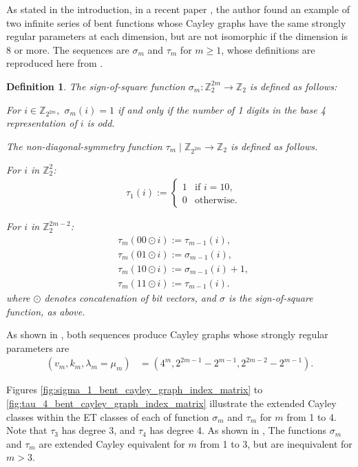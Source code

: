 \documentclass[12pt,a4paper]{article}
\newcommand{\mb}[1]{\mathbb{#1}}
\newcommand{\Z}{\mb{Z}}
\newcommand{\To}{\rightarrow}
\newtheorem*{definition}{Definition}
\begin{document}
As stated in the introduction, in a recent paper \cite{Leo17Hurwitz},
the author found an example of two infinite series of bent functions whose
Cayley graphs have the same strongly regular parameters at each dimension,
but are not isomorphic if the dimension is 8 or more.
The sequences are $\sigma_m$ and $\tau_m$ for $m \geqslant 1$,
whose definitions are reproduced here from \cite{Leo15Twin}.

\begin{definition}
\label{def-sigma-tau}
The sign-of-square function $\sigma_m : \Z_2^{2 m} \To \Z_2$ is defined as follows:

For $i \in \Z_{2^{2m}},$ $\sigma_m(i) = 1$ if and only if the number of
1 digits in the base 4 representation of $i$ is odd.

The non-diagonal-symmetry function $\tau_m \mid \Z_{2^{2 m}} \To \Z_2$
is defined as follows.

For $i$ in $\Z_2^2$:
\begin{align*}
&\tau_1(i) :=
\begin{cases}
1 &\text{if~}i = 10,
\\
0 &\text{otherwise}.
\end{cases}
\end{align*}

For $i$ in $\Z_2^{2 m - 2}$:
\begin{align*}
&\tau_m (00 \odot i) := \tau_{m-1}(i),
\\
&\tau_m (01 \odot i) := \sigma_{m-1}(i),
\\
&\tau_m (10 \odot i) := \sigma_{m-1}(i) + 1,
\\
&\tau_m (11 \odot i) := \tau_{m-1}(i).
\end{align*}
where $\odot$ denotes concatenation of bit vectors, and $\sigma$ is the sign-of-square function, as above.
\end{definition}

As shown in  \cite{Leo15Twin}, both sequences produce Cayley graphs whose strongly regular parameters are
\begin{align*}
(v_m,k_m,\lambda_m=\mu_m) &= (4^m, 2^{2 m - 1} - 2^{m-1}, 2^{2 m - 2} - 2^{m-1}).
\end{align*}

Figures \ref{fig:sigma_1_bent_cayley_graph_index_matrix} to \ref{fig:tau_4_bent_cayley_graph_index_matrix}
illustrate the extended Cayley classes within the ET classes of each of function $\sigma_m$ and $\tau_m$ for $m$ from 1 to 4.
Note that $\tau_3$ has degree 3, and $\tau_4$ has degree 4.
As shown in \cite{Leo17Hurwitz},
The functions $\sigma_m$ and $\tau_m$ are extended Cayley equivalent for $m$ from 1 to 3, but are inequivalent for $m>3$.
\end{document}
